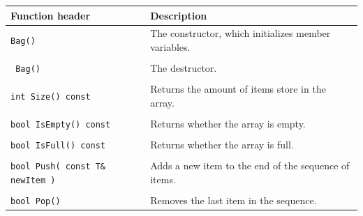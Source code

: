         \begin{center}
            \begin{tabular}{p{7cm} p{6cm}}
                \textbf{Function header} & \textbf{Description}
                \\ \hline
                \texttt{Bag()}
                    & The constructor, which initializes member variables.
                \\ \\
                \texttt{~Bag()}
                    & The destructor.
                \\ \\
                \texttt{int Size() const}
                    & Returns the amount of items store in the array.
                \\ \\
                \texttt{bool IsEmpty() const}
                    & Returns whether the array is empty.
                \\ \\
                \texttt{bool IsFull() const}
                    & Returns whether the array is full.
                \\ \\
                \texttt{bool Push( const T\& newItem )}
                    & Adds a new item to the end of the sequence of items.
                \\ \\
                \texttt{bool Pop()}
                    & Removes the last item in the sequence.
            \end{tabular}
        \end{center}
        
